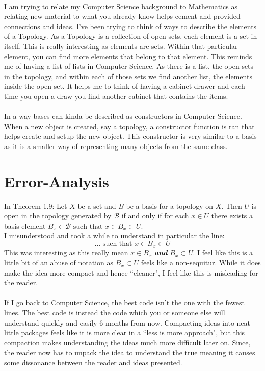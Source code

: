 \documentclass[10pt]{article}
\begin{document}
\\
I am trying to relate my Computer Science background to Mathematics as relating new material to what you already know helps cement and provided connections and ideas. I've been trying to think of ways to describe the elements of a Topology. As a Topology is a collection of open sets, each element is a set in itself. This is really interesting as elements are sets. Within that particular element, you can find more elements that belong to that element. This reminds me of having a list of lists in Computer Science. As there is a list, the open sets in the topology, and within each of those sets we find another list, the elements inside the open set. It helps me to think of having a cabinet drawer and each time you open a draw you find another cabinet that contains the items.\\
\\
In a way bases can kinda be described as constructors in Computer Science. When a new object is created, say a topology, a constructor function is ran that helps create and setup the new object. This constructor is very similar to a basis as it is a smaller way of representing many objects from the same class. 

\newpage

\section{Error-Analysis}
In Theorem 1.9: Let $X$ be a set and $B$ be a basis for a topology on $X .$ Then
$U$ is open in the topology generated by $\mathcal{B}$ if and only if for each $x \in U$ there exists a basis element $B_{x} \in \mathcal{B} \text { such that } x \in B_{x} \subset U$. 
\\
I misunderstood and took a while to understand in particular the line:
\[\ldots  \text { such that } x \in B_{x} \subset U \]
This was interesting as this really mean $ x\in B_x $ \textit{\bf and} $ B_x \subset U $. I feel like this is a little bit of an abuse of notation as $ B_x \subset U$ feels like a non-sequitur. While it does make the idea more compact and hence ``cleaner", I feel like this is misleading for the reader. \\
\\
If I go back to Computer Science, the best code isn't the one with the fewest lines. The best code is instead the code which you or someone else will understand quickly and easily 6 months from now. Compacting ideas into neat little packages feels like it is more clear in a ``less is more approach", but this compaction makes understanding the ideas much more difficult later on. Since, the reader now has to unpack the idea to understand the true meaning it causes some dissonance between the reader and ideas presented.
\end{document}
